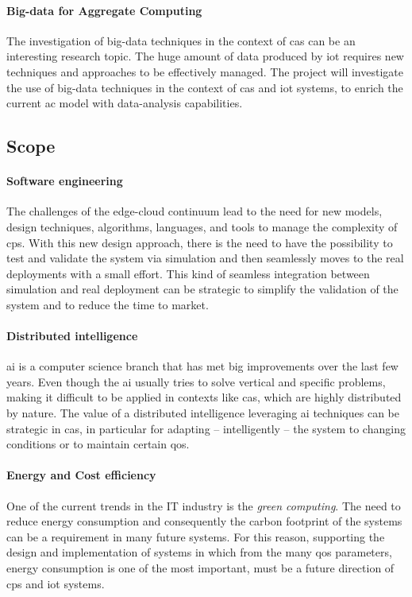 \documentclass[12pt]{article}
\begin{document}
\paragraph{Big-data for Aggregate Computing}
The investigation of big-data techniques in the context of \ac{cas} can be an interesting research topic.
%
The huge amount of data produced by \ac{iot} requires new techniques and approaches to be effectively managed.
%
The project will investigate the use of big-data techniques in the context of \ac{cas} and \ac{iot} systems,
to enrich the current \ac{ac} model with data-analysis capabilities.

\subsection{Scope}\label{subsec:scope}

\paragraph{Software engineering}
The challenges of the edge-cloud continuum lead to the need for new models,
design techniques, algorithms, languages, and tools to manage the complexity
of \ac{cps}.
%
With this new design approach,
there is the need to have the possibility to test and validate the system via simulation
and then seamlessly moves to the real deployments with a small effort.
%
This kind of seamless integration between simulation and real deployment can be strategic
to simplify the validation of the system and to reduce the time to market.

\paragraph{Distributed intelligence}
\ac{ai} is a computer science branch that has met big improvements over the last few years.
%
Even though the \ac{ai} usually tries to solve vertical and specific problems,
making it difficult to be applied in contexts like \ac{cas},
which are highly distributed by nature.
%
The value of a distributed intelligence leveraging \ac{ai} techniques can be strategic in \ac{cas},
in particular for adapting -- intelligently -- the system to changing conditions or to maintain certain \ac{qos}.


\paragraph{Energy and Cost efficiency}
One of the current trends in the IT industry is the \emph{green computing}.
%
The need to reduce energy consumption and consequently the carbon footprint of the systems can be a requirement in many future systems.
%
For this reason,
supporting the design and implementation of systems in which from the many \ac{qos} parameters,
energy consumption is one of the most important,
must be a future direction of \ac{cps} and \ac{iot} systems.
\end{document}

